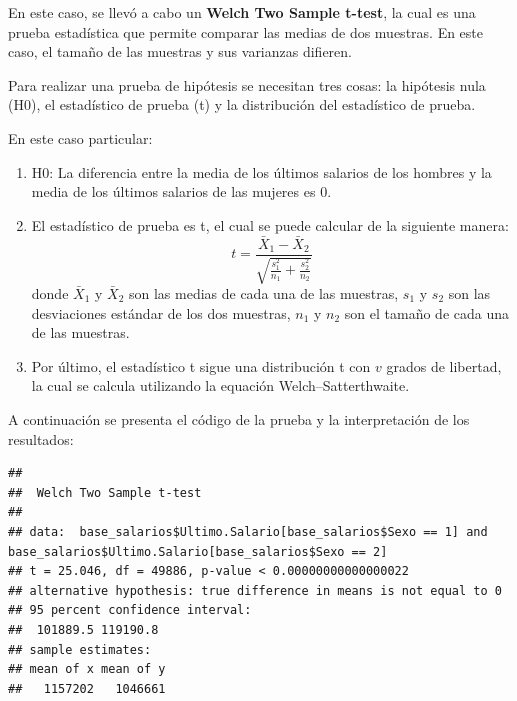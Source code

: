 \documentclass[
]{article}
\newenvironment{Shaded}{\begin{snugshade}}{\end{snugshade}}
\newcommand{\AttributeTok}[1]{\textcolor[rgb]{0.13,0.29,0.53}{#1}}
\newcommand{\ConstantTok}[1]{\textcolor[rgb]{0.56,0.35,0.01}{#1}}
\newcommand{\DecValTok}[1]{\textcolor[rgb]{0.00,0.00,0.81}{#1}}
\newcommand{\FloatTok}[1]{\textcolor[rgb]{0.00,0.00,0.81}{#1}}
\newcommand{\FunctionTok}[1]{\textcolor[rgb]{0.13,0.29,0.53}{\textbf{#1}}}
\newcommand{\NormalTok}[1]{#1}
\newcommand{\SpecialCharTok}[1]{\textcolor[rgb]{0.81,0.36,0.00}{\textbf{#1}}}
\newcommand{\StringTok}[1]{\textcolor[rgb]{0.31,0.60,0.02}{#1}}
\providecommand{\tightlist}{%
  \setlength{\itemsep}{0pt}\setlength{\parskip}{0pt}}
\begin{document}
En este caso, se llevó a cabo un \textbf{Welch Two Sample t-test}, la
cual es una prueba estadística que permite comparar las medias de dos
muestras. En este caso, el tamaño de las muestras y sus varianzas
difieren.

Para realizar una prueba de hipótesis se necesitan tres cosas: la
hipótesis nula (H0), el estadístico de prueba (t) y la distribución del
estadístico de prueba.

En este caso particular:

\begin{enumerate}
\def\labelenumi{\arabic{enumi}.}
\tightlist
\item
  H0: La diferencia entre la media de los últimos salarios de los
  hombres y la media de los últimos salarios de las mujeres es 0.
\item
  El estadístico de prueba es t, el cual se puede calcular de la
  siguiente manera:
  \[ t = \frac{\bar{X}_1 - \bar{X}_2}{\sqrt{\frac{s_1^2}{n_1} + \frac{s_2^2}{n_2}}} \]
  donde \(\bar{X}_1\) y \(\bar{X}_2\) son las medias de cada una de las
  muestras, \(s_1\) y \(s_2\) son las desviaciones estándar de los dos
  muestras, \(n_1\) y \(n_2\) son el tamaño de cada una de las muestras.
\item
  Por último, el estadístico t sigue una distribución t con \(v\) grados
  de libertad, la cual se calcula utilizando la equación
  Welch--Satterthwaite.
\end{enumerate}

A continuación se presenta el código de la prueba y la interpretación de
los resultados:

\begin{Shaded}
\end{Shaded}

\begin{verbatim}
## 
##  Welch Two Sample t-test
## 
## data:  base_salarios$Ultimo.Salario[base_salarios$Sexo == 1] and base_salarios$Ultimo.Salario[base_salarios$Sexo == 2]
## t = 25.046, df = 49886, p-value < 0.00000000000000022
## alternative hypothesis: true difference in means is not equal to 0
## 95 percent confidence interval:
##  101889.5 119190.8
## sample estimates:
## mean of x mean of y 
##   1157202   1046661
\end{verbatim}
\end{document}
